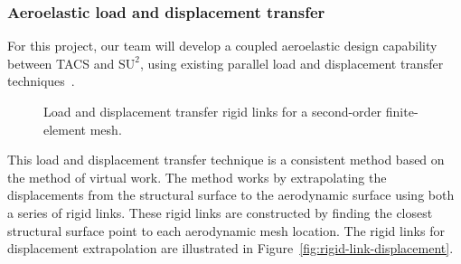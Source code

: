 \documentclass[]{aiaa-tc}
\begin{document}
\subsubsection{Aeroelastic load and displacement transfer}

For this project, our team will develop a coupled aeroelastic design
capability between TACS and $\text{SU}^2$, using existing parallel
load and displacement transfer
techniques~\cite{Kennedy:2014:tacs-tripan}. 

\begin{figure}
  \centering
  \caption{Load and displacement transfer rigid links for a
    second-order finite-element mesh.}
\end{figure}

This load and displacement transfer technique is a consistent method
based on the method of virtual work. The method works by extrapolating
the displacements from the structural surface to the aerodynamic
surface using both a series of rigid links. These rigid links are
constructed by finding the closest structural surface point to each
aerodynamic mesh location. The rigid links for displacement
extrapolation are illustrated in
Figure~\ref{fig:rigid-link-displacement}.
\end{document}

